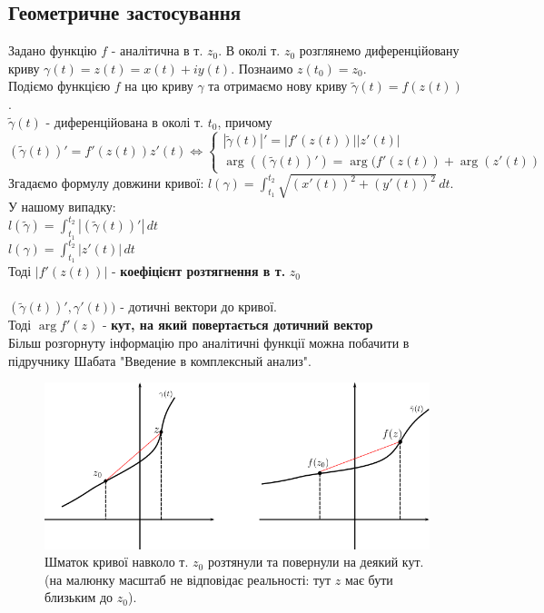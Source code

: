 \documentclass[a4paper, 10pt]{article}
\theoremstyle{theoremdd}
\theoremstyle{theoremdd}
\theoremstyle{theoremdd}
\theoremstyle{theoremdd}
\theoremstyle{theoremdd}
\theoremstyle{theoremdd}
\theoremstyle{theoremdd}
\theoremstyle{theoremdd}
\begin{document}
	\subsection{Геометричне застосування}
	Задано функцію $f$ - аналітична в т. $z_0$. В околі т. $z_0$ розглянемо диференційовану криву $\gamma(t) = z(t) = x(t)+iy(t)$. Познаимо $z(t_0) = z_0$.\\
	Подіємо функцією $f$ на цю криву $\gamma$ та отримаємо нову криву $\tilde{\gamma}(t) = f(z(t))$.\\
	$\tilde{\gamma}(t)$ - диференційована в околі т. $t_0$, причому\\
	$(\tilde{\gamma}(t))' = f'(z(t))z'(t) \iff
	\begin{cases}
	|\tilde{\gamma}(t)|' = |f'(z(t))||z'(t)| \\
	\arg ((\tilde{\gamma}(t))') = \arg(f'(z(t)) + \arg(z'(t))
	\end{cases}
	$\\
	Згадаємо формулу довжини кривої: $l(\gamma) = \displaystyle \int_{t_1}^{t_2} \sqrt{(x'(t))^2 +(y'(t))^2}\,dt$.\\
	У нашому випадку: \\ 
	$l(\tilde{\gamma}) = \displaystyle \int_{t_1}^{t_2} |(\tilde{\gamma}(t))'|\,dt$\\
	$l(\gamma) = \displaystyle \int_{t_1}^{t_2} |z'(t)|\,dt$\\
	Тоді $|f'(z(t))|$ - \textbf{коефіцієнт розтягнення в т.} $z_0$\\
	\\
	$(\tilde{\gamma}(t))', \gamma'(t))$ - дотичні вектори до кривої.\\
	Тоді $\arg f'(z)$ - \textbf{кут, на який повертається дотичний вектор}
	\bigskip \\
	Більш розгорнуту інформацію про аналітичні функції можна побачити в підручнику Шабата "Введение в комплексный анализ".
	\begin{figure}[h]
	\captionsetup{justification=centering}
	\centerline{\includegraphics[scale = 1]{geom sense.png}}
	\caption*{Шматок кривої навколо т. $z_0$ розтянули та повернули на деякий кут. (на малюнку масштаб не відповідає реальності: тут $z$ має бути близьким до $z_0$).}
	\end{figure}
	
\end{document}
